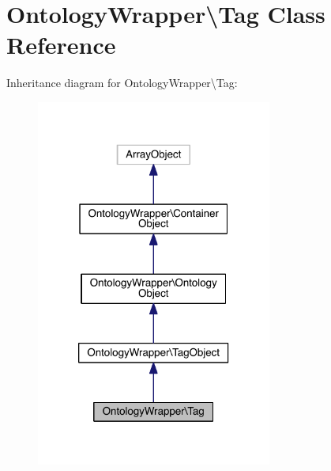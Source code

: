 \hypertarget{class_ontology_wrapper_1_1_tag}{\section{Ontology\-Wrapper\textbackslash{}Tag Class Reference}
\label{class_ontology_wrapper_1_1_tag}
}


Inheritance diagram for Ontology\-Wrapper\textbackslash{}Tag\-:\nopagebreak
\begin{figure}[H]
\begin{center}
\leavevmode
\includegraphics[width=220pt]{class_ontology_wrapper_1_1_tag__inherit__graph}
\end{center}
\end{figure}


